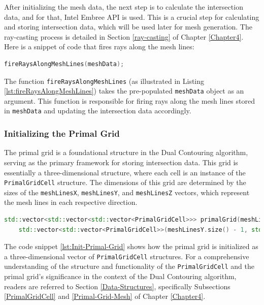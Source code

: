 After initializing the mesh data, the next step is to calculate the intersection data, and for that, Intel Embree API is used. This is a crucial step for calculating and storing intersection data, which will be used later for mesh generation. The ray-casting process is detailed in Section \ref{ray-casting} of Chapter \ref{Chapter4}. Here is a snippet of code that fires rays along the mesh lines:

\begin{lstlisting}[language=C++, caption=Firing Rays Along Mesh Lines]
fireRaysAlongMeshLines(meshData);
\end{lstlisting}

The function \texttt{fireRaysAlongMeshLines} (as illustrated in Listing \ref{lst:fireRaysAlongMeshLines}) takes the pre-populated \texttt{meshData} object as an argument. This function is responsible for firing rays along the mesh lines stored in \texttt{meshData} and updating the intersection data accordingly.

\subsubsection{Initializing the Primal Grid}

The primal grid is a foundational structure in the Dual Contouring algorithm, serving as the primary framework for storing intersection data. This grid is essentially a three-dimensional structure, where each cell is an instance of the \texttt{PrimalGridCell} structure. The dimensions of this grid are determined by the sizes of the \texttt{meshLinesX}, \texttt{meshLinesY}, and \texttt{meshLinesZ} vectors, which represent the mesh lines in each respective direction.

\begin{lstlisting}[language=C++, caption=Initializing the Primal Grid, label=lst:Init-Primal-Grid]
std::vector<std::vector<std::vector<PrimalGridCell>>> primalGrid(meshLinesX.size() - 1,
    std::vector<std::vector<PrimalGridCell>>(meshLinesY.size() - 1, std::vector<PrimalGridCell>(meshLinesZ.size() - 1)));
\end{lstlisting}

The code snippet \ref{lst:Init-Primal-Grid} shows how the primal grid is initialized as a three-dimensional vector of \texttt{PrimalGridCell} structures. For a comprehensive understanding of the structure and functionality of the \texttt{PrimalGridCell} and the primal grid's significance in the context of the Dual Contouring algorithm, readers are referred to Section \ref{Data-Structures}, specifically Subsections \ref{PrimalGridCell} and \ref{Primal-Grid-Mesh} of Chapter \ref{Chapter4}.

